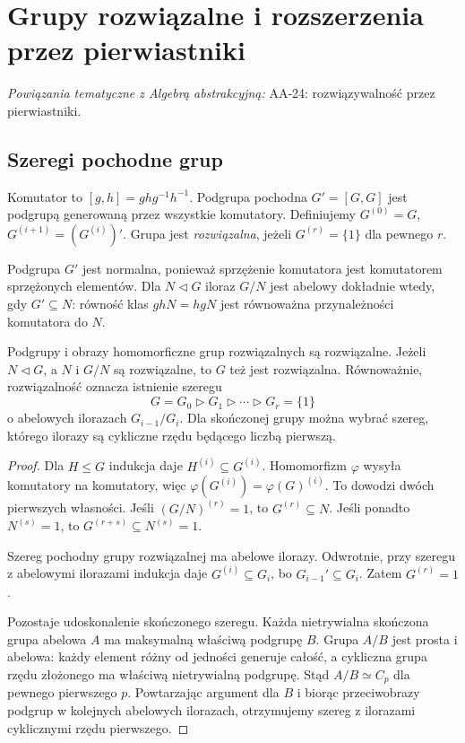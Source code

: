 \chapter{Grupy rozwiązalne i rozszerzenia przez pierwiastniki}

\providecommand{\atlasref}[2]{#2}
\noindent\emph{Powiązania tematyczne z Algebrą abstrakcyjną:} \atlasref{AA-24::aa:ch:radical-solvability}{AA-24: rozwiązywalność przez pierwiastniki}.


\section{Szeregi pochodne grup}

\begin{definicja}
Komutator to $[g,h]=ghg^{-1}h^{-1}$. Podgrupa pochodna $G'=[G,G]$ jest podgrupą generowaną przez wszystkie komutatory. Definiujemy $G^{(0)}=G$, $G^{(i+1)}=(G^{(i)})'$. Grupa jest \emph{rozwiązalna}, jeżeli $G^{(r)}=\{1\}$ dla pewnego $r$.
\end{definicja}

Podgrupa $G'$ jest normalna, ponieważ sprzężenie komutatora jest komutatorem sprzężonych elementów. Dla $N\triangleleft G$ iloraz $G/N$ jest abelowy dokładnie wtedy, gdy $G'\subseteq N$: równość klas $ghN=hgN$ jest równoważna przynależności komutatora do $N$.

\begin{lemat}
Podgrupy i obrazy homomorficzne grup rozwiązalnych są rozwiązalne. Jeżeli $N\triangleleft G$, a $N$ i $G/N$ są rozwiązalne, to $G$ też jest rozwiązalna. Równoważnie, rozwiązalność oznacza istnienie szeregu
\[
G=G_0\triangleright G_1\triangleright\cdots\triangleright G_r=\{1\}
\]
o abelowych ilorazach $G_{i-1}/G_i$. Dla skończonej grupy można wybrać szereg, którego ilorazy są cykliczne rzędu będącego liczbą pierwszą.
\end{lemat}
\begin{proof}
Dla $H\le G$ indukcja daje $H^{(i)}\subseteq G^{(i)}$. Homomorfizm $\varphi$ wysyła komutatory na komutatory, więc $\varphi(G^{(i)})=\varphi(G)^{(i)}$. To dowodzi dwóch pierwszych własności. Jeśli $(G/N)^{(r)}=1$, to $G^{(r)}\subseteq N$. Jeśli ponadto $N^{(s)}=1$, to $G^{(r+s)}\subseteq N^{(s)}=1$.

Szereg pochodny grupy rozwiązalnej ma abelowe ilorazy. Odwrotnie, przy szeregu z abelowymi ilorazami indukcja daje $G^{(i)}\subseteq G_i$, bo $G_{i-1}'\subseteq G_i$. Zatem $G^{(r)}=1$.

Pozostaje udoskonalenie skończonego szeregu. Każda nietrywialna skończona grupa abelowa $A$ ma maksymalną właściwą podgrupę $B$. Grupa $A/B$ jest prosta i abelowa: każdy element różny od jedności generuje całość, a cykliczna grupa rzędu złożonego ma właściwą nietrywialną podgrupę. Stąd $A/B\simeq C_p$ dla pewnego pierwszego $p$. Powtarzając argument dla $B$ i biorąc przeciwobrazy podgrup w kolejnych abelowych ilorazach, otrzymujemy szereg z ilorazami cyklicznymi rzędu pierwszego.
\end{proof}

